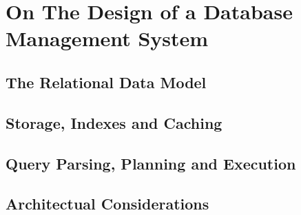 \chapter{On The Design of a Database Management System}


\section{The Relational Data Model}

\section{Storage, Indexes and Caching}

\section{Query Parsing, Planning and Execution}

\section{Architectual Considerations}